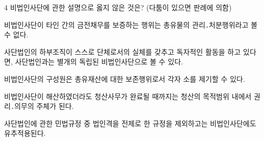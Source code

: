 \begin{question}{4}
비법인사단에 관한 설명으로 옳지 않은 것은? (다툼이 있으면 판례에 의함)
\begin{choices}
  \item 비법인사단이 타인 간의 금전채무를 보증하는 행위는 총유물의 관리․처분행위라고 볼 수 없다.
  \item 사단법인의 하부조직이 스스로 단체로서의 실체를 갖추고 독자적인 활동을 하고 있다면, 사단법인과는 별개의 독립된 비법인사단으로 볼 수 있다.
  \item 비법인사단의 구성원은 총유재산에 대한 보존행위로서 각자 소를 제기할 수 있다.
  \item 비법인사단이 해산하였더라도 청산사무가 완료될 때까지는 청산의 목적범위 내에서 권리․의무의 주체가 된다.
  \item 사단법인에 관한 민법규정 중 법인격을 전제로 한 규정을 제외하고는 비법인사단에도 유추적용된다.
\end{choices}
\end{question}

